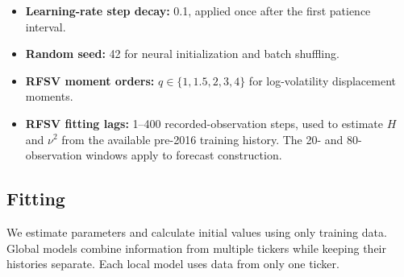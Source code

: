 \documentclass[12pt,a4paper]{article}
\numberwithin{equation}{section}
\numberwithin{table}{section}
\numberwithin{figure}{section}
\begin{document}
\begin{itemize}
    \item \textbf{Learning-rate step decay:} 0.1, applied once after the first patience interval.
    \item \textbf{Random seed:} 42 for neural initialization and batch shuffling.
    \item \textbf{RFSV moment orders:} $q\in\{1,1.5,2,3,4\}$ for log-volatility displacement moments.
    \item \textbf{RFSV fitting lags:} 1–400 recorded-observation steps, used to estimate $H$ and $\nu^2$ from the available pre-2016 training history. The 20- and 80-observation windows apply to forecast construction. 
\end{itemize}

\subsection{Fitting}
We estimate parameters and calculate initial values using only training data. Global models combine information from multiple tickers while keeping their histories separate. Each local model uses data from only one ticker.
\end{document}
